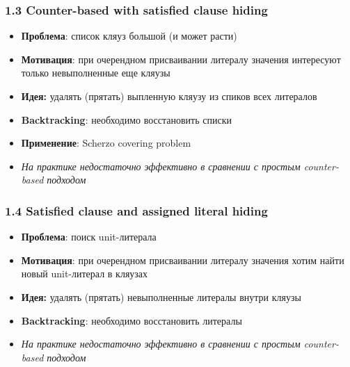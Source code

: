 \documentclass[aspectratio=169,xcolor=table,english]{beamer}
\begin{document}
\begin{frame}[fragile] \frametitle{1.3 Counter-based with satisfied clause hiding}
    \begin{itemize}
        \item \textbf{Проблема}: список кляуз большой (и может расти)
        \item \textbf{Мотивация}: при очерендном присваивании литералу значения интересуют только невыполненные еще кляузы
        \item \textbf{Идея:} удалять (прятать) выпленную кляузу из спиков всех литералов
        \item \textbf{Backtracking}: необходимо восстановить списки
        \item \textbf{Применение}: Scherzo covering problem
        \item \textit{На практике недостаточно эффективно в сравнении с простым counter-based подходом} 
    \end{itemize}
\end{frame}

\begin{frame}[fragile] \frametitle{1.4 Satisfied clause and assigned literal hiding}
    \begin{itemize}
        \item \textbf{Проблема}: поиск unit-литерала
        \item \textbf{Мотивация}: при очерендном присваивании литералу значения хотим найти новый unit-литерал в кляузах
        \item \textbf{Идея:} удалять (прятать) невыполненные литералы внутри кляузы
        \item \textbf{Backtracking}: необходимо восстановить литералы
        \item \textit{На практике недостаточно эффективно в сравнении с простым counter-based подходом} 
    \end{itemize}
\end{frame}
\end{document}
